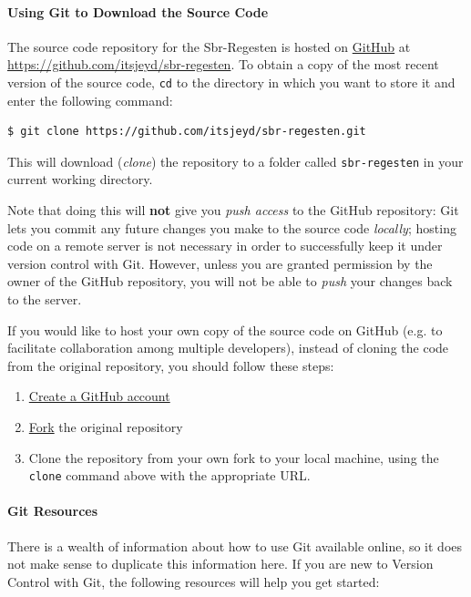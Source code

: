 \paragraph{Using Git to Download the Source Code}

The source code repository for the Sbr-Regesten is hosted on
\href{https://github.com/}{GitHub} at
\url{https://github.com/itsjeyd/sbr-regesten}. To obtain a copy of the
most recent version of the source code, \texttt{cd} to the directory
in which you want to store it and enter the following command:

\begin{verbatim}
$ git clone https://github.com/itsjeyd/sbr-regesten.git
\end{verbatim}

This will download (\emph{clone}) the repository to a folder called
\texttt{sbr-regesten} in your current working directory.

Note that doing this will \textbf{not} give you \emph{push access} to
the GitHub repository: Git lets you commit any future changes you make
to the source code \emph{locally}; hosting code on a remote server is
not necessary in order to successfully keep it under version control
with Git. However, unless you are granted permission by the owner of
the GitHub repository, you will not be able to \emph{push} your
changes back to the server.

If you would like to host your own copy of the source code on GitHub
(e.g. to facilitate collaboration among multiple developers), instead
of cloning the code from the original repository, you
should follow these steps:

\begin{enumerate}
\item \href{https://github.com/plans}{Create a GitHub account}
\item \href{https://help.github.com/articles/fork-a-repo}{Fork} the
  original repository
\item Clone the repository from your own fork to your local machine,
  using the \texttt{clone} command above with the appropriate URL.
\end{enumerate}

\paragraph{Git Resources}
There is a wealth of information about how to use Git available
online, so it does not make sense to duplicate this information here.
If you are new to Version Control with Git, the following resources
will help you get started:

